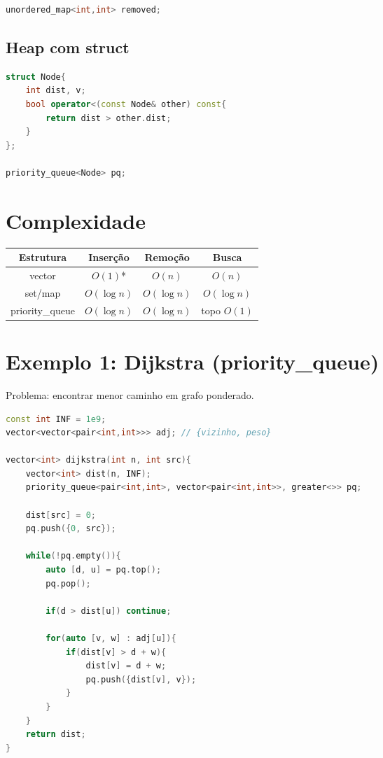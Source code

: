 \documentclass[11pt]{article}
\begin{document}
\begin{lstlisting}[language=C++]
unordered_map<int,int> removed;
\end{lstlisting}

\subsection{Heap com struct}

\begin{lstlisting}[language=C++]
struct Node{
    int dist, v;
    bool operator<(const Node& other) const{
        return dist > other.dist;
    }
};

priority_queue<Node> pq;
\end{lstlisting}

\section{Complexidade}

\begin{center}
\begin{tabular}{|c|c|c|c|}
\hline
Estrutura & Inserção & Remoção & Busca \\
\hline
vector & $O(1)$* & $O(n)$ & $O(n)$ \\
set/map & $O(\log n)$ & $O(\log n)$ & $O(\log n)$ \\
priority\_queue & $O(\log n)$ & $O(\log n)$ & topo $O(1)$ \\
\hline
\end{tabular}
\end{center}

\section{Exemplo 1: Dijkstra (priority\_queue)}

Problema: encontrar menor caminho em grafo ponderado.

\begin{lstlisting}[language=C++]
const int INF = 1e9;
vector<vector<pair<int,int>>> adj; // {vizinho, peso}

vector<int> dijkstra(int n, int src){
    vector<int> dist(n, INF);
    priority_queue<pair<int,int>, vector<pair<int,int>>, greater<>> pq;

    dist[src] = 0;
    pq.push({0, src});

    while(!pq.empty()){
        auto [d, u] = pq.top();
        pq.pop();

        if(d > dist[u]) continue;

        for(auto [v, w] : adj[u]){
            if(dist[v] > d + w){
                dist[v] = d + w;
                pq.push({dist[v], v});
            }
        }
    }
    return dist;
}
\end{lstlisting}
\end{document}
